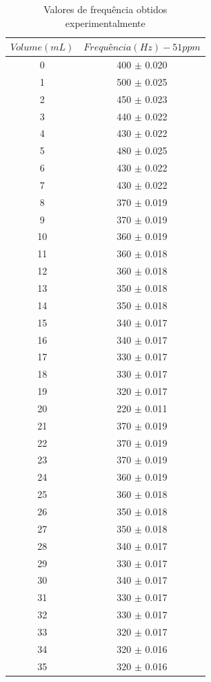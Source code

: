 \documentclass[a4paper]{instrumentacao}
\begin{document}
\begin{longtable}{cc}
\caption{Valores de frequência obtidos experimentalmente} \label{tab:resultados-pluviometro-frequencia} \\
\textbf{$Volume (mL)$} & \textbf{$Frequência (Hz) - 51ppm$} \\ \hline
 0 & 400 $\pm$ 0.020 \\
 1 & 500 $\pm$ 0.025 \\
 2 & 450 $\pm$ 0.023 \\
 3 & 440 $\pm$ 0.022 \\
 4 & 430 $\pm$ 0.022 \\
 5 & 480 $\pm$ 0.025 \\
 6 & 430 $\pm$ 0.022 \\
 7 & 430 $\pm$ 0.022 \\
 8 & 370 $\pm$ 0.019 \\
 9 & 370 $\pm$ 0.019 \\
 10 & 360 $\pm$ 0.019 \\
 11 & 360 $\pm$ 0.018 \\
 12 & 360 $\pm$ 0.018 \\
 13 & 350 $\pm$ 0.018 \\
 14 & 350 $\pm$ 0.018 \\
 15 & 340 $\pm$ 0.017 \\
 16 & 340 $\pm$ 0.017 \\
 17 & 330 $\pm$ 0.017 \\
 18 & 330 $\pm$ 0.017 \\
 19 & 320 $\pm$ 0.017 \\
 20 & 220 $\pm$ 0.011 \\
 21 & 370 $\pm$ 0.019 \\
 22 & 370 $\pm$ 0.019 \\
 23 & 370 $\pm$ 0.019 \\
 24 & 360 $\pm$ 0.019 \\
 25 & 360 $\pm$ 0.018 \\
 26 & 350 $\pm$ 0.018 \\
 27 & 350 $\pm$ 0.018 \\
 28 & 340 $\pm$ 0.017 \\
 29 & 330 $\pm$ 0.017 \\
 30 & 340 $\pm$ 0.017 \\
 31 & 330 $\pm$ 0.017 \\
 32 & 330 $\pm$ 0.017 \\
 33 & 320 $\pm$ 0.017 \\
 34 & 320 $\pm$ 0.016 \\
 35 & 320 $\pm$ 0.016 \\

\end{longtable}
\end{document}
